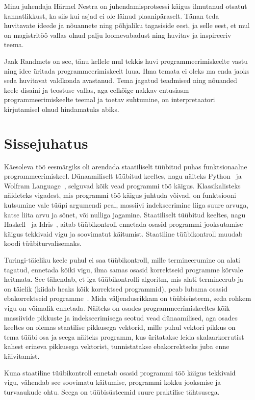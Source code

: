 \documentclass[12pt]{article}
\newcommand\peatykk[1]{
  \clearpage
  \section{#1}}
\begin{document}
    Minu juhendaja Härmel Nestra on juhendamisprotsessi käigus ilmutanud otsatut kannatlikkust, ka siis kui asjad ei ole läinud plaanipäraselt. Tänan teda huvitavate ideede ja nõuannete ning põhjaliku tagasiside eest, ja selle eest, et mul on magistritöö vallas olnud palju loomevabadust ning huvitav ja inspireeriv teema.

    Jaak Randmets on see, tänu kellele mul tekkis huvi programmeerimiskeelte vastu ning idee üritada programmeerimiskeelt luua. Ilma temata ei oleks ma enda jaoks seda huvitavat valdkonda avastanud. Tema jagatud teadmised ning nõuanded keele disaini ja teostuse vallas, aga eelkõige nakkav entusiasm programmeerimiskeelte teemal ja toetav suhtumine, on interpretaatori kirjutamisel olnud hindamatuks abiks.
  \peatykk{Sissejuhatus}
    Käesoleva töö eesmärgiks oli arendada staatiliselt tüübitud puhas funktsionaalne programmeerimiskeel. Dünaamiliselt tüübitud keeltes, nagu näiteks Python~\cite{Pyt} ja Wolfram Language~\cite{Wol}, selguvad kõik vead programmi töö käigus. Klassikalisteks näideteks vigadest, mis programmi töö käigus juhtuda võivad, on funktsiooni kutsumine vale tüüpi argumendi peal, massiivi indekseerimine liiga suure arvuga, katse liita arvu ja sõnet, või nulliga jagamine. Staatiliselt tüübitud keeltes, nagu Haskell~\cite{Has} ja Idris~\cite{The_Idr}, aitab tüübikontroll ennetada osasid programmi jooksutamise käigus tekkivaid vigu ja soovimatut käitumist. Staatiline tüübikontroll muudab koodi tüübiturvalisemaks.

    Turingi-täieliku keele puhul ei saa tüübikontroll, mille termineerumine on alati tagatud, ennetada kõiki vigu, ilma samas osasid korrektseid programme kõrvale heitmata. See tähendab, et iga tüübikontrolli-algoritm, mis alati termineerub ja on täielik (kiidab heaks kõik korrektsed programmid), peab lubama osasid ebakorrektseid programme~\cite{Typ}. Mida väljendusrikkam on tüübisüsteem, seda rohkem vigu on võimalik ennetada. Näiteks on osades programmeerimiskeeltes kõik massiivide pikkuste ja indekseerimisega seotud vead dünaamilised, aga osades keeltes on olemas staatilise pikkusega vektorid, mille puhul vektori pikkus on tema tüübi osa ja seega näiteks programm, kus üritatakse leida skalaarkorrutist kahest erineva pikkusega vektorist, tunnistatakse ebakorrektseks juba enne käivitamist.

    Kuna staatiline tüübikontroll ennetab osasid programmi töö käigus tekkivaid vigu, vähendab see soovimatu käitumise, programmi kokku jooksmise ja turvaaukude ohtu. Seega on tüübisüsteemid suure praktilise tähtsusega.
\end{document}
